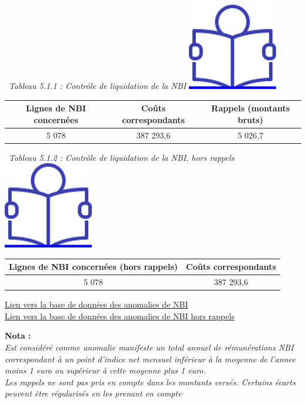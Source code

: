 ~\emph{Tableau 5.1.1 : Contrôle de liquidation de la NBI}
\href{../Docs/Notices/fiche_NBI_liq.odt}{\includegraphics{icones/Notice.png}}

\begin{longtable}[]{@{}ccc@{}}
\toprule
Lignes de NBI concernées & Coûts correspondants & Rappels (montants
bruts)\tabularnewline
\midrule
\endhead
5 078 & 387 293,6 & 5 026,7\tabularnewline
\bottomrule
\end{longtable}

~\emph{Tableau 5.1.2 : Contrôle de liquidation de la NBI, hors rappels}
~
\href{../Docs/Notices/fiche_NBI_liq.odt}{\includegraphics{icones/Notice.png}}

\begin{longtable}[]{@{}cc@{}}
\toprule
Lignes de NBI concernées (hors rappels) & Coûts
correspondants\tabularnewline
\midrule
\endhead
5 078 & 387 293,6\tabularnewline
\bottomrule
\end{longtable}

\href{../Bases/Fiabilite/lignes.nbi.anormales.csv}{Lien vers la base de
données des anomalies de NBI}\\
\href{../Bases/Fiabilite/lignes.nbi.anormales.hors.rappels.csv}{Lien vers
la base de données des anomalies de NBI hors rappels}

\textbf{Nota :}\\
\emph{Est considéré comme anomalie manifeste un total annuel de
rémunérations NBI correspondant à un point d'indice net mensuel
inférieur à la moyenne de l'annee moins 1 euro ou supérieur à cette
moyenne plus 1 euro.}\\
\emph{Les rappels ne sont pas pris en compte dans les montants versés.
Certains écarts peuvent être régularisés en les prenant en compte}

